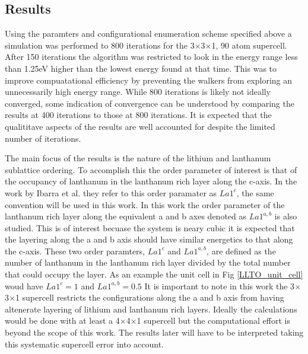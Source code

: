 \documentclass[aps,prl,reprint,superscriptaddress,showkeys]{revtex4-1}
\begin{document}
\subsection{Results}
  Using the paramters and configurational enumeration scheme specified above a simulation was performed to 800 iterations for  the 3$\times$3$\times$1,  90 atom supercell. After 150 iterations the algorithm was restricted to look  in the energy range less than 1.25eV higher than the lowest energy found at that time. This was to improve compuatational efficiency by preventing the walkers from exploring an unnecessarily high energy range. While 800 iterations is likely not ideally converged, some indication of convergence can be understood by comparing the results at 400 iterations to those at 800 iterations. It is expected that the qualititave aspects of the results are well accounted for despite the limited number of iterations. 
  
  The main focus of the results is the nature of the lithium and lanthanum sublattice ordering. To accomplish this the order parameter of interest is that of the occupancy of lanthanum in the lanthanum rich layer along the c-axis.  In the work by Ibarra et al. \cite{P4mmmstrucuture} they refer to this order paramater as $La1^c$, the same convention will be used in this work. In this work the order parameter of the lanthanum rich layer along the equivalent a and b axes denoted as $La1^{a,b}$ is also studied. This is of interest becuase the system is neary cubic it is expected that the layering along the a and b axis should have similar energetics to that along the c-axis. These two order paramters, $La1^c$ and $La1^{a,b}$, are defined as the number of lanthanum in the lanthanum rich layer divided by the total number that could occupy the layer. As an example the unit cell in Fig \ref{LLTO_unit_cell} woud have $La1^c=1$ and $La1^{a,b}=0.5$  It is important to note in this work the 3$\times$3$\times$1 supercell restricts the configurations along the a and b axis from having altenerate layering of lithium and lanthanum rich layers. Ideally the calculations would be done with at least a 4$\times$4$\times$1 supercell but the computational effort is beyond the scope of this work. The results later will have to be interpreted taking this systematic supercell error into account.  
  
\end{document}
